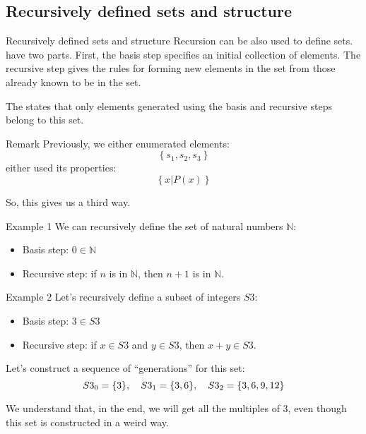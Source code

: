 \documentclass[a4paper]{article}
\begin{document}
\subsection{Recursively defined sets and structure}


\begin{parag}{Recursively defined sets and structure}
    Recursion can be also used to define sets.  have two parts. First, the basis step specifies an initial collection of elements. The recursive step gives the rules for forming new elements in the set from those already known to be in the set.

    The  states that only elements generated using the basis and recursive steps belong to this set.

    \begin{subparag}{Remark}
        Previously, we either enumerated elements: 
        \[\left\{s_1, s_2, s_3\right\}\]
        either used its properties: 
        \[\left\{x | P\left(x\right)\right\}\]
        
        So, this gives us a third way.
    \end{subparag}
    
\end{parag}

\begin{parag}{Example 1}
    We can recursively define the set of natural numbers $\mathbb{N}$:
    \begin{itemize}
        \item Basis step: $0 \in \mathbb{N}$
        \item Recursive step: if $n$ is in $\mathbb{N}$, then $n+1$ is in $\mathbb{N}$.
    \end{itemize}
    
\end{parag}

\begin{parag}{Example 2}
    Let's recursively define a subset of integers $S3$:
    \begin{itemize}
        \item Basis step: $3 \in S3$
        \item Recursive step: if $x \in S3$ and $y \in S3$, then $x + y \in S3$.
    \end{itemize}

    Let's construct a sequence of ``generations'' for this set: 
    \[S3_0 = \left\{3\right\}, \mathspace S3_1 = \left\{3, 6\right\}, \mathspace S3_2 = \left\{3, 6, 9, 12\right\}\]
     
    We understand that, in the end, we will get all the multiples of 3, even though this set is constructed in a weird way.
\end{parag}
\end{document}
